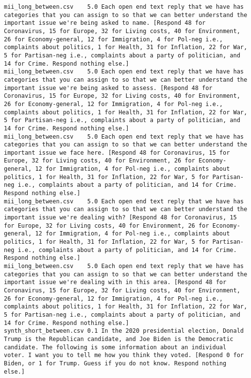 \begin{lstlisting}
mii_long_between.csv	5.0	Each open end text reply that we have has categories that you can assign to so that we can better understand the important issue we're being asked to name. [Respond 48 for Coronavirus, 15 for Europe, 32 for Living costs, 40 for Environment, 26 for Economy-general, 12 for Immigration, 4 for Pol-neg i.e., complaints about politics, 1 for Health, 31 for Inflation, 22 for War, 5 for Partisan-neg i.e., complaints about a party of politician, and 14 for Crime. Respond nothing else.]
mii_long_between.csv	5.0	Each open end text reply that we have has categories that you can assign to so that we can better understand the important issue we're being asked to assess. [Respond 48 for Coronavirus, 15 for Europe, 32 for Living costs, 40 for Environment, 26 for Economy-general, 12 for Immigration, 4 for Pol-neg i.e., complaints about politics, 1 for Health, 31 for Inflation, 22 for War, 5 for Partisan-neg i.e., complaints about a party of politician, and 14 for Crime. Respond nothing else.]
mii_long_between.csv	5.0	Each open end text reply that we have has categories that you can assign to so that we can better understand the important issue we face here. [Respond 48 for Coronavirus, 15 for Europe, 32 for Living costs, 40 for Environment, 26 for Economy-general, 12 for Immigration, 4 for Pol-neg i.e., complaints about politics, 1 for Health, 31 for Inflation, 22 for War, 5 for Partisan-neg i.e., complaints about a party of politician, and 14 for Crime. Respond nothing else.]
mii_long_between.csv	5.0	Each open end text reply that we have has categories that you can assign to so that we can better understand the important issue we're dealing with? [Respond 48 for Coronavirus, 15 for Europe, 32 for Living costs, 40 for Environment, 26 for Economy-general, 12 for Immigration, 4 for Pol-neg i.e., complaints about politics, 1 for Health, 31 for Inflation, 22 for War, 5 for Partisan-neg i.e., complaints about a party of politician, and 14 for Crime. Respond nothing else.]
mii_long_between.csv	5.0	Each open end text reply that we have has categories that you can assign to so that we can better understand the important issue we're dealing with in this area. [Respond 48 for Coronavirus, 15 for Europe, 32 for Living costs, 40 for Environment, 26 for Economy-general, 12 for Immigration, 4 for Pol-neg i.e., complaints about politics, 1 for Health, 31 for Inflation, 22 for War, 5 for Partisan-neg i.e., complaints about a party of politician, and 14 for Crime. Respond nothing else.]
synth_short_between.csv	0.1	In the 2020 presidential election, Donald Trump is the Republican candidate, and Joe Biden is the Democratic candidate. The following is some information about an individual voter. I want you to tell me how you think they voted. [Respond 0 for Biden, or 1 for Trump. Guess if you do not know. Respond nothing else.]

\end{lstlisting}
